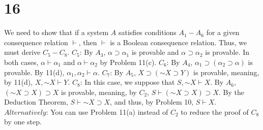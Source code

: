 \documentclass{article}
\newcommand*{\oldneg}{\mathord{\sim}}
\theoremstyle{definition}
\begin{document}
\section*{16}
We need to show that if a system $A$ satisfies conditions $A_1-A_6$ for a given consequence relation $\vdash$, then $\vdash$ is a Boolean consequence 
relation. Thus, we must derive $C_5-C_8$.\newline
$C_5$: By $A_3$, $\alpha\supset\alpha_1$ is provable and $\alpha\supset\alpha_2$ is provable. 
In both cases, $\alpha\vdash\alpha_1$ and $\alpha\vdash\alpha_2$ by 
Problem 11(c).\newline
$C_6$: By $A_4$, $\alpha_1\supset(\alpha_2\supset\alpha)$ is provable. By 11(d), $\alpha_1,\alpha_2\vdash\alpha$.\newline
$C_7$: By $A_5$, $X\supset(\oldneg X\supset Y)$ is provable, meaning, by 11(d), $X,\oldneg X\vdash Y$.\newline
$C_8$: In this case, we suppose that $S,\oldneg X\vdash X$. By $A_6$, $(\oldneg X\supset X)\supset X$ is provable, meaning, by $C_2$, 
$S\vdash (\oldneg X\supset X)\supset X$. By the Deduction Theorem, $S\vdash\oldneg X\supset X$, and thus, by Problem 10, $S\vdash X$.\newline 
$Alternatively$: You can use Problem 11(a) instead of $C_2$ to reduce the proof of $C_8$ by one step.
\end{document}
